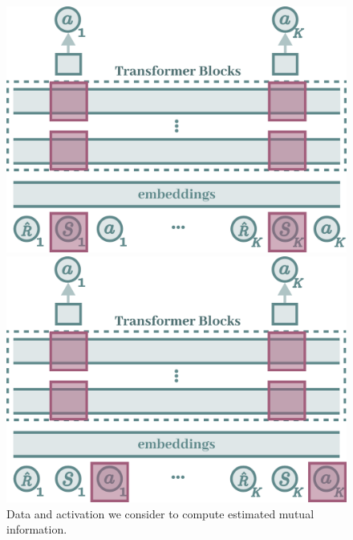 \documentclass{article}
\begin{document}
\begin{figure}[h]
    \centering
    \begin{minipage}[b]{0.4\linewidth}
    \includegraphics[width=\linewidth]{figs/diagram_mi_x_no_context.pdf}
    \end{minipage}
    \hspace{1cm}
    \begin{minipage}[b]{0.4\linewidth}
    \includegraphics[width=\linewidth]{figs/diagram_mi_y_no_context.pdf}
    \end{minipage}
    \caption{Data and activation we consider to compute estimated mutual information.}
    \label{fig:diagram_mutual_information_no_context}
\end{figure}
\end{document}

